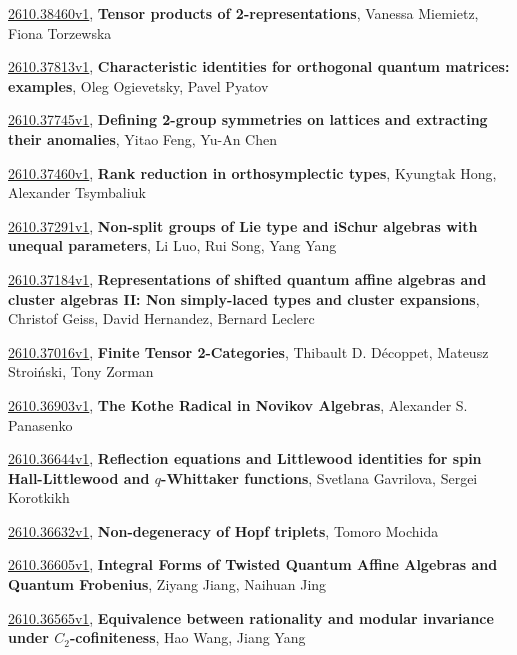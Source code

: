\documentclass[9pt, a4paper]{article}
\theoremstyle{plain}
\theoremstyle{definition}
\theoremstyle{remark}
\newcommand{\arxiv}[3]{\href{https://arxiv.org/abs/#1}{#1}, \textbf{\textcolor{arxivblue}{#2}}, #3}
\begin{document}
\arxiv{2610.38460v1}{Tensor products of 2-representations}{Vanessa Miemietz, Fiona Torzewska}

\arxiv{2610.37813v1}{Characteristic identities for orthogonal quantum matrices: examples}{Oleg Ogievetsky, Pavel Pyatov}

\arxiv{2610.37745v1}{Defining 2-group symmetries on lattices and extracting their anomalies}{Yitao Feng, Yu-An Chen}

\arxiv{2610.37460v1}{Rank reduction in orthosymplectic types}{Kyungtak Hong, Alexander Tsymbaliuk}

\arxiv{2610.37291v1}{Non-split groups of Lie type and iSchur algebras with unequal parameters}{Li Luo, Rui Song, Yang Yang}

\arxiv{2610.37184v1}{Representations of shifted quantum affine algebras and cluster algebras II: Non simply-laced types and cluster expansions}{Christof Geiss, David Hernandez, Bernard Leclerc}

\arxiv{2610.37016v1}{Finite Tensor 2-Categories}{Thibault D. Décoppet, Mateusz Stroiński, Tony Zorman}

\arxiv{2610.36903v1}{The Kothe Radical in Novikov Algebras}{Alexander S. Panasenko}

\arxiv{2610.36644v1}{Reflection equations and Littlewood identities for spin Hall-Littlewood and $q$-Whittaker functions}{Svetlana Gavrilova, Sergei Korotkikh}

\arxiv{2610.36632v1}{Non-degeneracy of Hopf triplets}{Tomoro Mochida}

\arxiv{2610.36605v1}{Integral Forms of Twisted Quantum Affine Algebras and Quantum Frobenius}{Ziyang Jiang, Naihuan Jing}

\arxiv{2610.36565v1}{Equivalence between rationality and modular invariance under $C_2$-cofiniteness}{Hao Wang, Jiang Yang}

\end{document}
